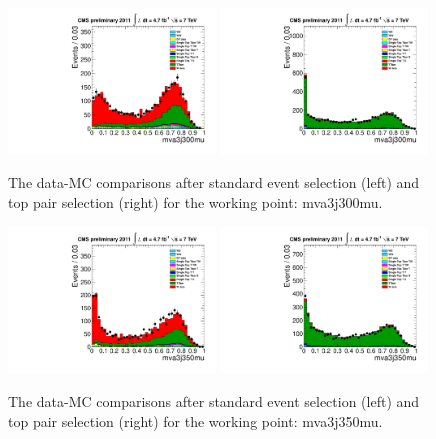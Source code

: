 \begin{figure}[!t]
  \centering
  \includegraphics[width=0.49\textwidth]{figs/cl-mva3j300mu-normal.pdf}
  \includegraphics[width=0.49\textwidth]{figs/cl-mva3j300mu-inTTbar.pdf}
  \caption{\label{fig:mva:plots-mva3j300mu} The data-MC comparisons
    after standard event selection (left) and top pair
    selection (right) for the working point: mva3j300mu.}
\end{figure}

\begin{figure}[!t]
  \centering
  \includegraphics[width=0.49\textwidth]{figs/cl-mva3j350mu-normal.pdf}
  \includegraphics[width=0.49\textwidth]{figs/cl-mva3j350mu-inTTbar.pdf}
  \caption{\label{fig:mva:plots-mva3j350mu} The data-MC comparisons
    after standard event selection (left) and top pair
    selection (right) for the working point: mva3j350mu.}
\end{figure}

